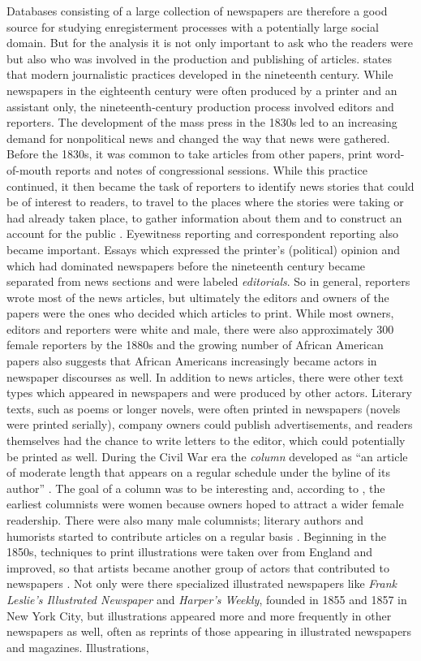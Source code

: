 Databases consisting of a large collection of newspapers are therefore a good source for studying enregisterment processes with a potentially large social domain. But for the analysis it is not only important to ask who the readers were but also who was involved in the production and publishing of articles. \citet{DickenGarcia1998} states that modern journalistic practices developed in the nineteenth century. While newspapers in the eighteenth century were often produced by a printer and an assistant only, the nineteenth-century production process involved editors and reporters. The development of the mass press in the 1830s led to an increasing demand for nonpolitical news and changed the way that news were gathered. Before the 1830s, it was common to take articles from other papers, print word-of-mouth reports and notes of congressional sessions. While this practice continued, it then became the task of reporters to identify news stories that could be of interest to readers, to travel to the places where the stories were taking or had already taken place, to gather information about them and to construct an account for the public \citep[585]{DickenGarcia1998}. Eyewitness reporting and correspondent reporting also became important. Essays which expressed the printer’s (political) opinion and which had dominated newspapers before the nineteenth century became separated from news sections and were labeled \textit{editorials}. So in general, reporters wrote most of the news articles, but ultimately the editors and owners of the papers were the ones who decided which articles to print. While most owners, editors and reporters were white and male, there were also approximately 300 female reporters by the 1880s and the growing number of African American papers also suggests that African Americans increasingly became actors in newspaper discourses as well. In addition to news articles, there were other text types which appeared in newspapers and were produced by other actors. Literary texts, such as poems or longer novels, were often printed in newspapers (novels were printed serially), company owners could publish advertisements, and readers themselves had the chance to write letters to the editor, which could potentially be printed as well. During the Civil War era the \textit{column} developed as “an article of moderate length that appears on a regular schedule under the byline of its author” \citep[438]{Riley1998}. The goal of a column was to be interesting and, according to \citet[439]{Riley1998}, the earliest columnists were women because owners hoped to attract a wider female readership. There were also many male columnists; literary authors and humorists started to contribute articles on a regular basis \citep[439]{Riley1998}. Beginning in the 1850s, techniques to print illustrations were taken over from England and improved, so that artists became another group of actors that contributed to newspapers \citep[267]{Everett1998}. Not only were there specialized illustrated newspapers like \emph{Frank Leslie’s Illustrated Newspaper} and\emph{ Harper’s Weekly}, founded in 1855 and 1857 in New York City, but illustrations appeared more and more frequently in other newspapers as well, often as reprints of those appearing in illustrated newspapers and magazines. Illustrations, 